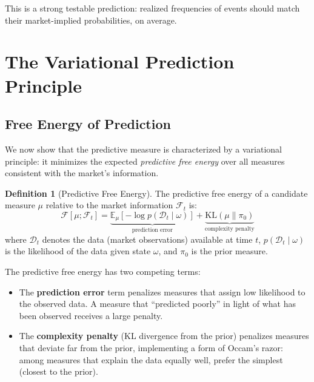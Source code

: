\documentclass[12pt,a4paper]{article}
\theoremstyle{definition}
\newtheorem{definition}[theorem]{Definition}
\newcommand{\E}{\mathbb{E}}
\newcommand{\F}{\mathcal{F}}
\newcommand{\KL}{\mathrm{KL}}
\begin{document}
This is a strong testable prediction: realized frequencies of events should match their market-implied probabilities, on average.



\section{The Variational Prediction Principle}\label{sec:variational}

\subsection{Free Energy of Prediction}

We now show that the predictive measure is characterized by a variational principle: it minimizes the expected \emph{predictive free energy} over all measures consistent with the market's information.

\begin{definition}[Predictive Free Energy]\label{def:pred_free_energy}
The predictive free energy of a candidate measure $\mu$ relative to the market information $\F_t$ is:
\begin{equation}\label{eq:pred_free_energy}
    \mathcal{F}[\mu; \F_t] = \underbrace{\E_\mu\left[-\log p(\mathcal{D}_t \mid \omega)\right]}_{\text{prediction error}} + \underbrace{\KL(\mu \| \pi_0)}_{\text{complexity penalty}}
\end{equation}
where $\mathcal{D}_t$ denotes the data (market observations) available at time $t$, $p(\mathcal{D}_t \mid \omega)$ is the likelihood of the data given state $\omega$, and $\pi_0$ is the prior measure.
\end{definition}

The predictive free energy has two competing terms:
\begin{itemize}
    \item The \textbf{prediction error} term penalizes measures that assign low likelihood to the observed data. A measure that ``predicted poorly'' in light of what has been observed receives a large penalty.
    \item The \textbf{complexity penalty} (KL divergence from the prior) penalizes measures that deviate far from the prior, implementing a form of Occam's razor: among measures that explain the data equally well, prefer the simplest (closest to the prior).
\end{itemize}
\end{document}
